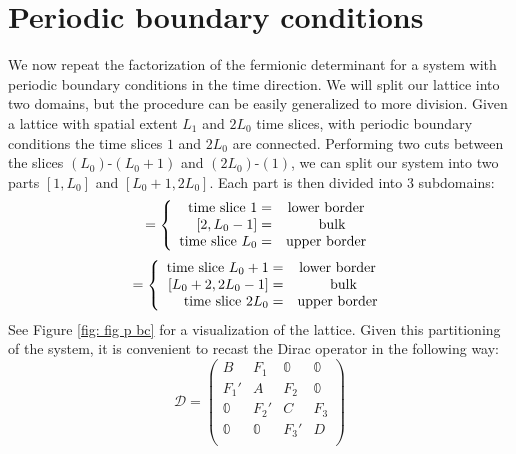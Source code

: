 \section{Periodic boundary conditions} 
We now repeat the factorization of the fermionic determinant for a system with periodic boundary conditions in the time direction. We will split our lattice into two domains, but the procedure can be easily generalized to more division. Given a lattice with spatial extent $L_1$ and $2L_0$ time slices, with periodic boundary conditions the time slices $1$ and $2L_0$ are connected. Performing two cuts between the slices $(L_0)$-$(L_0 + 1)$ and $(2L_0)$-$(1)$, we can split our system into two parts $[1, L_0]$ and $[L_0 + 1, 2L_0]$. Each part is then divided into 3 subdomains:
\begin{equation*}
    [1, L_0] = \left\{ \begin{array}{rcl} \mbox{time slice } 1 =& \mbox{lower border} \\ \left[2, L_0 - 1\right] =& \hspace{3 mm} \mbox{bulk}  \\ 
     \mbox{time slice }L_0 =& \mbox{upper border} \end{array} \right.
\end{equation*}
\begin{equation*}
    [L_0 + 1, 2L_0] = \left\{ \begin{array}{rcl} \mbox{time slice } L_0 + 1 =& \mbox{lower border} \\ \left[L_0 + 2, 2L_0 - 1\right] =& \hspace{3 mm} \mbox{bulk}  \\ 
     \mbox{time slice }2L_0 =& \mbox{upper border} \end{array} \right.
\end{equation*}
See Figure \eqref{fig: fig p bc} for a visualization of the lattice. Given this partitioning of the system, it is convenient to recast the Dirac operator in the following way:
\begin{equation}
    \mathcal{D} = \begin{pmatrix}
        B & F_1 & \mathbb{0} & \mathbb{0} \\
        F_1' & A & F_2 & \mathbb{0} \\
        \mathbb{0} & F_2' & C & F_3 \\
        \mathbb{0} & \mathbb{0} & F_3' & D \\
    \end{pmatrix}
\end{equation}
